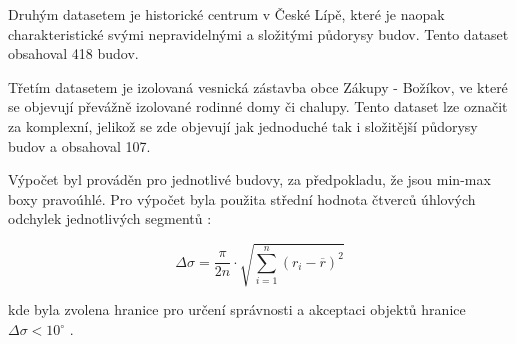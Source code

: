 \documentclass[12pt, a4paper]{article}
\begin{document}
Druhým datasetem je historické centrum v České Lípě, které je naopak charakteristické svými nepravidelnými a složitými půdorysy budov. Tento dataset obsahoval 418 budov.

Třetím datasetem je izolovaná vesnická zástavba obce Zákupy - Božíkov, ve které se objevují převážně izolované rodinné domy či chalupy. Tento dataset lze označit za komplexní, jelikož se zde objevují jak jednoduché tak i složitější půdorysy budov a obsahoval 107.

Výpočet byl prováděn pro jednotlivé budovy, za předpokladu, že jsou min-max boxy pravoúhlé. Pro výpočet byla použita střední hodnota čtverců úhlových odchylek jednotlivých segmentů :

$$\Delta\sigma = \frac{\pi}{2n} \cdot \sqrt{\sum_{i=1}^{n} (r_i - \overline{r})^2}
$$

kde byla zvolena hranice pro určení správnosti a akceptaci objektů hranice $\Delta\sigma < 10^{\circ}$ \parencite{bayer}.
\end{document}
